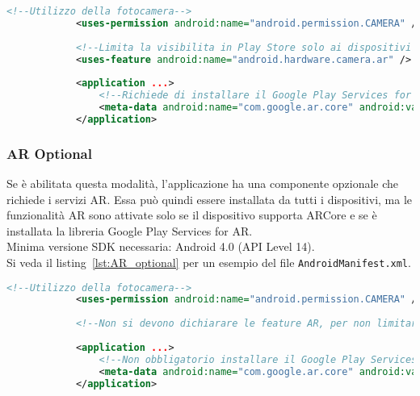 \documentclass[crop=false, class=book]{standalone}
\begin{document}
	\begin{center}
		\begin{minipage}{0.95\textwidth}
			\begin{lstlisting}[caption={AndroidManifest.xml per la modalità AR Required.}, label={lst:AR_required}, language=xml, morekeywords={android:name, android:value}, keywordstyle={\color{NavyBlue}\bfseries}, alsodigit={-}, stringstyle={\color{ForestGreen}\ttfamily}, emph={manifest, uses-permission, uses-feature, meta-data, application},emphstyle={\color{OrangeRed}}, commentstyle={\color{gray}\ttfamily} ]
			<!--Utilizzo della fotocamera-->
			<uses-permission android:name="android.permission.CAMERA" />
			
			<!--Limita la visibilita in Play Store solo ai dispositivi supportati-->
			<uses-feature android:name="android.hardware.camera.ar" />
			
			<application ...>
				<!--Richiede di installare il Google Play Services for AR-->
				<meta-data android:name="com.google.ar.core" android:value="required" />
			</application>
			\end{lstlisting}
		\end{minipage}
	\end{center}
	
	
	\subsubsection{AR Optional}
	Se è abilitata questa modalità, l'applicazione ha una componente opzionale che richiede i servizi AR. Essa può quindi essere installata da tutti i dispositivi, ma le funzionalità AR sono attivate solo se il dispositivo supporta ARCore e se è installata la libreria  Google Play Services for AR. 
	\\
	Minima versione SDK necessaria: Android 4.0 (API Level 14).
	\\
	Si veda il listing~\vref{lst:AR_optional} per un esempio del file \verb|AndroidManifest.xml|.
	\begin{center}
		\begin{minipage}{0.95\textwidth}
			\begin{lstlisting}[caption={AndroidManifest.xml per la modalità AR Optional.}, label={lst:AR_optional}, language=xml, morekeywords={android:name, android:value}, keywordstyle={\color{NavyBlue}\bfseries}, alsodigit={-}, stringstyle={\color{ForestGreen}\ttfamily}, emph={manifest, uses-permission, uses-feature, meta-data, application},emphstyle={\color{OrangeRed}}, commentstyle={\color{gray}\ttfamily} ]
			<!--Utilizzo della fotocamera-->
			<uses-permission android:name="android.permission.CAMERA" />
			
			<!--Non si devono dichiarare le feature AR, per non limitarne la visibilita-->
			
			<application ...>
				<!--Non obbligatorio installare il Google Play Services for AR-->
				<meta-data android:name="com.google.ar.core" android:value="optional" />
			</application>
			\end{lstlisting}
		\end{minipage}
	\end{center}
\end{document}
